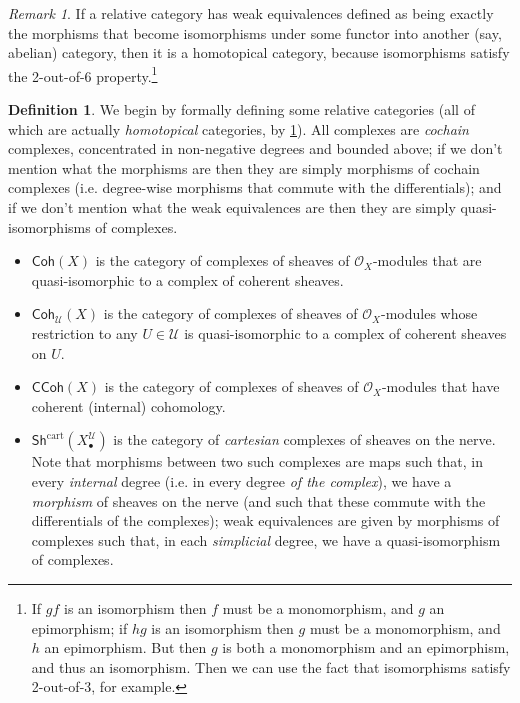 \documentclass[11pt,fleqn]{article}
\theoremstyle{plain}
\theoremstyle{definition}
\newtheorem{definition}[theorem]{Definition}
\theoremstyle{remark}
\newtheorem{remark}[theorem]{Remark}
\numberwithin{equation}{theorem}
\newcommand{\cover}{\mathcal{U}}
\newcommand{\OO}{\mathcal{O}}
\newcommand{\gcohX}{\mathsf{Coh}(X)}
\newcommand{\gcohUX}{\mathsf{Coh}_{\cover}(X)}
\newcommand{\gccohX}{\mathsf{CCoh}(X)}
\newcommand{\cartshX}{\mathsf{Sh}^\mathrm{cart}(X_\bullet^\cover)}
\begin{document}
        \begin{remark}\label{remark:relative-is-homotopic-if-qiso}
            If a relative category has weak equivalences defined as being exactly the morphisms that become isomorphisms under some functor into another (say, abelian) category, then it is a homotopical category, because isomorphisms satisfy the 2-out-of-6 property.\footnote{If $gf$ is an isomorphism then $f$ must be a monomorphism, and $g$ an epimorphism; if $hg$ is an isomorphism then $g$ must be a monomorphism, and $h$ an epimorphism. But then $g$ is both a monomorphism and an epimorphism, and thus an isomorphism. Then we can use the fact that isomorphisms satisfy 2-out-of-3, for example.}
        \end{remark}

        \begin{definition}
            We begin by formally defining some relative categories (all of which are actually \emph{homotopical} categories, by \cref{remark:relative-is-homotopic-if-qiso}).
            All complexes are \emph{cochain} complexes, concentrated in non-negative degrees and bounded above; if we don't mention what the morphisms are then they are simply morphisms of cochain complexes (i.e. degree-wise morphisms that commute with the differentials); and if we don't mention what the weak equivalences are then they are simply quasi-isomorphisms of complexes.
            \begin{itemize}
                \item $\gcohX$ is the category of complexes of sheaves of $\OO_X$-modules that are quasi-isomorphic to a complex of coherent sheaves.
                \item $\gcohUX$ is the category of complexes of sheaves of $\OO_X$-modules whose restriction to any $U\in\cover$ is quasi-isomorphic to a complex of coherent sheaves on $U$.
                \item $\gccohX$ is the category of complexes of sheaves of $\OO_X$-modules that have coherent (internal) cohomology.
                \item $\cartshX$ is the category of \emph{cartesian} complexes of sheaves on the nerve.
                    Note that morphisms between two such complexes are maps such that, in every \emph{internal} degree (i.e. in every degree \emph{of the complex}), we have a \emph{morphism} of sheaves on the nerve (and such that these commute with the differentials of the complexes); weak equivalences are given by morphisms of complexes such that, in each \emph{simplicial} degree, we have a quasi-isomorphism of complexes.

\end{itemize}
\end{definition}
\end{document}
